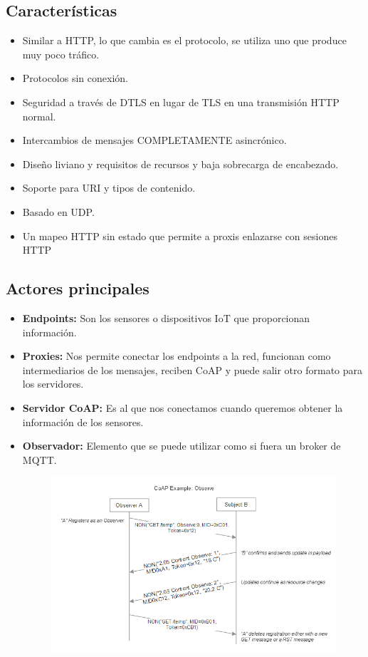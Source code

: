 \documentclass[12pt]{report} %
\begin{document}
\subsection{Características}
\begin{itemize}
	\item Similar a HTTP, lo que cambia es el protocolo, se utiliza uno que produce muy poco tráfico.
	\item Protocolos sin conexión.
	\item Seguridad a través de DTLS en lugar de TLS en una transmisión HTTP normal.
	\item Intercambios de mensajes COMPLETAMENTE asincrónico.
	\item Diseño liviano y requisitos de recursos y baja sobrecarga de encabezado.
	\item Soporte para URI y tipos de contenido.
	\item Basado en UDP.
	\item Un mapeo HTTP sin estado que permite a proxis enlazarse con sesiones HTTP
\end{itemize}

\subsection{Actores principales}
\begin{itemize}
	\item \textbf{Endpoints:} Son los sensores o dispositivos IoT que proporcionan información.
	\item \textbf{Proxies:} Nos permite conectar los endpoints a la red, funcionan como intermediarios de los mensajes, reciben CoAP y puede salir otro formato para los servidores.
	\item \textbf{Servidor CoAP:} Es al que nos conectamos cuando queremos obtener la información de los sensores.
	\item \textbf{Observador:} Elemento que se puede utilizar como si fuera un broker de MQTT.
	\begin{figure}[H]
		{\includegraphics[scale=.48]{2a2f42a1-0813-4e84-a244-72e6f2667ba8.png}}
	\end{figure}

	
\end{itemize}
\end{document}
